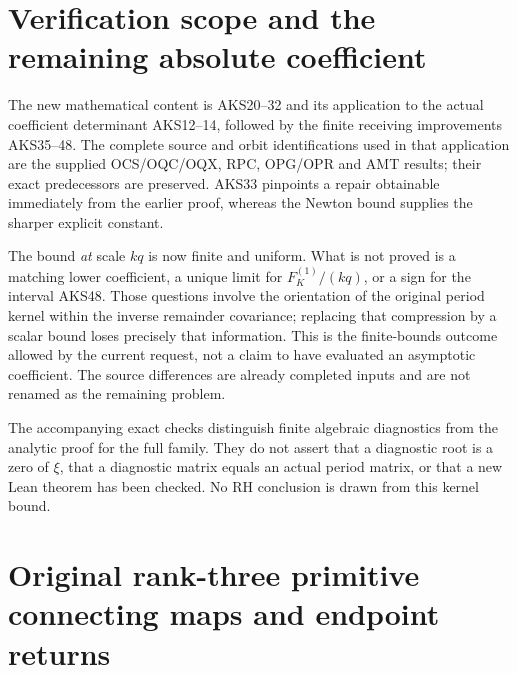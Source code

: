 \documentclass[11pt,a4paper]{article}
\begin{document}
\section{Verification scope and the remaining absolute coefficient}
\label{aks:sec:AKS-scope}

The new mathematical content is AKS20--32 and its application to the
actual coefficient determinant AKS12--14, followed by the finite
receiving improvements AKS35--48. The complete source and orbit
identifications used in that application are the supplied OCS/OQC/OQX,
RPC, OPG/OPR and AMT results; their exact predecessors are preserved.
AKS33 pinpoints a repair obtainable immediately from the earlier proof,
whereas the Newton bound supplies the sharper explicit constant.

The bound \emph{at} scale $kq$ is now finite and uniform. What is not
proved is a matching lower coefficient, a unique limit for
$F_K^{(1)}/(kq)$, or a sign for the interval AKS48. Those questions involve
the orientation of the original period kernel within the inverse
remainder covariance; replacing that compression by a scalar bound
loses precisely that information. This is the finite-bounds outcome
allowed by the current request, not a claim to have evaluated an
asymptotic coefficient. The source differences are already completed
inputs and are not renamed as the remaining problem.

The accompanying exact checks distinguish finite algebraic diagnostics
from the analytic proof for the full family. They do not assert that a
diagnostic root is a zero of $\xi$, that a diagnostic matrix equals an
actual period matrix, or that a new Lean theorem has been checked.
No RH conclusion is drawn from this kernel bound.

\endgroup

\clearpage
\begingroup


\setcounter{equation}{0}
\renewcommand{\theequation}{PRT.\arabic{equation}}
\section*{Original rank-three primitive connecting maps and endpoint returns}
\clearpage
\label{prt:MPBUILD:PRT_CONNECTING_ENDPOINT_RETURN:start}
\end{document}
